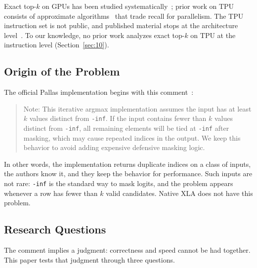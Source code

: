 \documentclass[sigconf,nonacm,balance=false]{acmart}
\newcommand{\code}[1]{\texttt{#1}}
\begin{document}
Exact top-$k$ on GPUs has been studied systematically~\cite{shanbhag2018,johnson2021faiss,gaihre2021drtopk,li2024radik,xie2025rtopk,zhang2023air}; prior work on TPU consists of approximate algorithms~\cite{chern2022tpuknn,samaga2026} that trade recall for parallelism. The TPU instruction set is not public, and published material stops at the architecture level~\cite{norrie2021tpuv2,jouppi2023tpuv4,jouppi2026ironwood}. To our knowledge, no prior work analyzes exact top-$k$ on TPU at the instruction level (Section~\ref{sec:10}).

\subsection{Origin of the Problem}
\label{sec:1.2}

The official Pallas implementation begins with this comment~\cite{jax-topk-impl}:

\begin{quote}
Note: This iterative argmax implementation assumes the input has at least $k$ values distinct from \code{-inf}. If the input contains fewer than $k$ values distinct from \code{-inf}, all remaining elements will be tied at \code{-inf} after masking, which may cause repeated indices in the output. We keep this behavior to avoid adding expensive defensive masking logic.
\end{quote}

In other words, the implementation returns duplicate indices on a class of inputs, the authors know it, and they keep the behavior for performance. Such inputs are not rare: \code{-inf} is the standard way to mask logits, and the problem appears whenever a row has fewer than $k$ valid candidates. Native XLA does not have this problem.

\subsection{Research Questions}
\label{sec:1.3}

The comment implies a judgment: correctness and speed cannot be had together. This paper tests that judgment through three questions.
\end{document}
